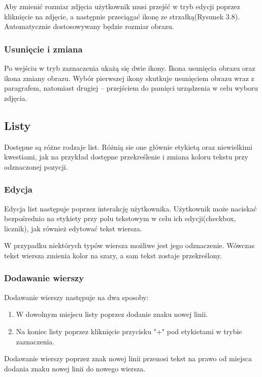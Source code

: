 Aby zmienić rozmiar zdjęcia użytkownik musi przejść w tryb edycji poprzez kliknięcie na zdjęcie, a następnie przeciągać ikonę ze strzałką(Rysunek 3.8). Automatycznie dostosowywany będzie rozmiar obrazu.

\subsubsection{Usunięcie i zmiana}

Po wejściu w tryb zaznaczenia ukażą się dwie ikony. Ikona usunięcia obrazu oraz ikona zmiany obrazu.
Wybór pierwszej ikony skutkuje usunięciem obrazu wraz z paragrafem, natomiast drugiej -- przejściem do pamięci urządzenia w celu wyboru zdjęcia.

\subsection{Listy}

Dostępne są różne rodzaje list. Różnią sie one głównie etykietą oraz niewielkimi kwestiami, jak na przykład dostępne przekreślenie i zmiana koloru tekstu przy odznaczonej pozycji.

\subsubsection{Edycja}

Edycja list następuje poprzez interakcję użytkownika. Użytkownik może naciskać bezpośrednio na etykiety przy polu tekstowym w celu ich edycji(checkbox, licznik), jak również edytować tekst wiersza.

W przypadku niektórych typów wiersza możliwe jest jego odznaczenie. Wówczas tekst wiersza zmienia kolor na szary, a sam tekst zostaje przekreślony.

\subsubsection{Dodawanie wierszy}

Dodawanie wierszy następuje na dwa sposoby:

\begin{enumerate}
    \item W dowolnym miejscu listy poprzez dodanie znaku nowej linii.
    \item Na koniec listy poprzez kliknięcie przycisku "+" pod etykietami w trybie zaznaczenia. 
\end{enumerate}

Dodawanie wierszy poprzez znak nowej linii przenosi tekst na prawo od miejsca dodania znaku nowej linii do nowego wiersza.

